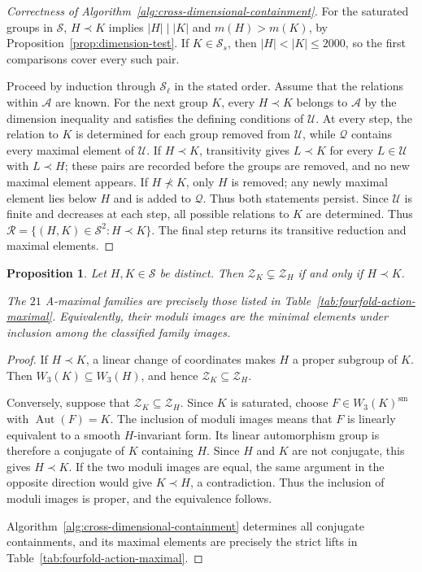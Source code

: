 \documentclass[12pt]{amsart}
\numberwithin{equation}{section}
\theoremstyle{plain}
\newtheorem{prop}[thm]{Proposition}
\theoremstyle{definition}
\theoremstyle{remark}
\DeclareMathOperator{\Aut}{Aut}
\begin{document}
\begin{proof}[Correctness of
Algorithm~\ref{alg:cross-dimensional-containment}]
For the saturated groups in $\mathscr S$, $H\prec K$ implies
$|H|\mid|K|$ and $m(H)>m(K)$, by
Proposition~\ref{prop:dimension-test}. If $K\in\mathscr S_s$, then
$|H|<|K|\leq2000$, so the first comparisons cover every such pair.

Proceed by induction through $\mathscr S_\ell$ in the stated order.
Assume that the relations within $\mathscr A$ are known. For the next
group $K$, every $H\prec K$ belongs to $\mathscr A$ by the dimension
inequality and satisfies the defining conditions of $\mathscr U$.
At every step, the relation to $K$ is determined for each group removed
from $\mathscr U$, while $\mathscr Q$ contains every maximal element of
$\mathscr U$. If $H\prec K$, transitivity gives $L\prec K$ for every
$L\in\mathscr U$ with $L\prec H$; these pairs are recorded before the
groups are removed, and no new maximal element appears. If
$H\not\prec K$, only $H$ is removed; any newly maximal element lies
below $H$ and is added to $\mathscr Q$. Thus both statements persist.
Since $\mathscr U$ is finite and decreases at each step, all possible
relations to $K$ are determined. Thus
$\mathscr R=\{(H,K)\in\mathscr S^2:H\prec K\}$. The final step returns
its transitive reduction and maximal elements.
\end{proof}

\begin{prop}\label{prop:fourfold-containment}
Let $H,K\in\mathscr S$ be distinct. Then
$\mathcal Z_K\subsetneq\mathcal Z_H$ if and only if $H\prec K$.

The $21$ A-maximal families are precisely those listed in
Table~\ref{tab:fourfold-action-maximal}. Equivalently, their moduli images
are the minimal elements under inclusion among the classified family images.
\end{prop}

\begin{proof}
If $H\prec K$, a linear change of coordinates makes $H$ a proper
subgroup of $K$. Then $W_3(K)\subseteq W_3(H)$,
and hence $\mathcal Z_K\subseteq\mathcal Z_H$.

Conversely, suppose that $\mathcal Z_K\subseteq\mathcal Z_H$.
Since $K$ is saturated, choose $F\in W_3(K)^{\mathrm{sm}}$
with $\Aut(F)=K$. The inclusion of moduli images means that
$F$ is linearly equivalent to a smooth $H$-invariant form.
Its linear automorphism group is therefore a conjugate
of $K$ containing $H$. Since $H$ and $K$ are not conjugate, this gives
$H\prec K$. If the two moduli images are equal, the same argument
in the opposite direction would give $K\prec H$, a contradiction.
Thus the inclusion of moduli images is proper,
and the equivalence follows.

Algorithm~\ref{alg:cross-dimensional-containment} determines all
conjugate containments, and its maximal elements are precisely the
strict lifts in Table~\ref{tab:fourfold-action-maximal}.
\end{proof}
\end{document}
